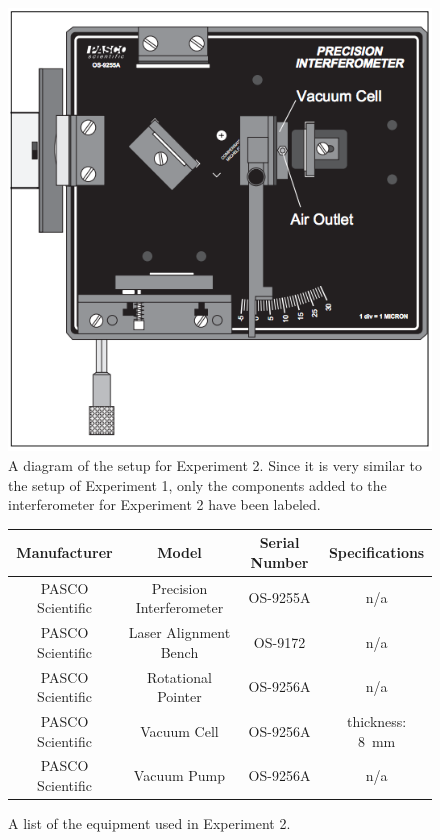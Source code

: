\documentclass[12pt]{article}
\begin{document}
\begin{figure}[H]
  \label{fig:equip2}
  \begin{center}
    \includegraphics[scale=0.7]{equip2.png}
  \end{center}
  \caption{A diagram of the setup for Experiment 2. Since it is very similar to
    the setup of Experiment 1, only the components added to the interferometer
    for Experiment 2 have been labeled.}
\end{figure}

\begin{figure}[H]
  \label{tab:equip2List}
  \caption{A list of the equipment used in Experiment 2.}
  \begin{center}
    \begin{tabular}{|c|c|c|c|}
      \hline
      Manufacturer & Model & Serial Number & Specifications \\
      \hline
      PASCO Scientific & Precision Interferometer & OS-9255A & n/a \\
      PASCO Scientific & Laser Alignment Bench    & OS-9172  & n/a \\
      PASCO Scientific & Rotational Pointer       & OS-9256A & n/a \\
      PASCO Scientific & Vacuum Cell              & OS-9256A & thickness: \SI{8}{\milli\meter} \\
      PASCO Scientific & Vacuum Pump              & OS-9256A & n/a \\
      \hline
    \end{tabular}
  \end{center}
\end{figure}
\end{document}
